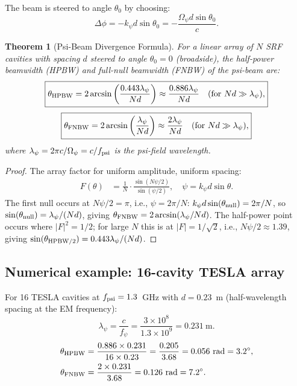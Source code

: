 \documentclass[11pt,twocolumn]{article}
\newcommand{\Opsi}{\Omega_\psi}
\newcommand{\ee}[1]{\times 10^{#1}}
\newtheorem{theorem}{Theorem}[section]
\begin{document}
The beam is steered to angle $\theta_0$ by choosing:
\begin{equation}
\boxed{
\Delta\phi = -k_\psi d\sin\theta_0 = -\frac{\Opsi d\sin\theta_0}{c}.
}
\label{eq:phase_steering}
\end{equation}

\begin{theorem}[Psi-Beam Divergence Formula]
\label{thm:beam_divergence}
For a linear array of $N$ SRF cavities with spacing $d$ steered to
angle $\theta_0 = 0$ (broadside), the half-power beamwidth (HPBW)
and full-null beamwidth (FNBW) of the psi-beam are:
\begin{equation}
\boxed{
\theta_{\rm HPBW} = 2\arcsin\left(\frac{0.443\lambda_\psi}{Nd}\right)
\approx \frac{0.886\lambda_\psi}{Nd}
\quad\text{(for }Nd\gg\lambda_\psi\text{)},
}
\label{eq:HPBW}
\end{equation}
\begin{equation}
\boxed{
\theta_{\rm FNBW} = 2\arcsin\left(\frac{\lambda_\psi}{Nd}\right)
\approx \frac{2\lambda_\psi}{Nd}
\quad\text{(for }Nd\gg\lambda_\psi\text{)},
}
\label{eq:FNBW}
\end{equation}
where $\lambda_\psi = 2\pi c/\Opsi = c/f_{\rm psi}$ is the psi-field
wavelength.
\end{theorem}

\begin{proof}
The array factor for uniform amplitude, uniform spacing:
\begin{align}
F(\theta) &= \frac{1}{N}\cdot\frac{\sin(N\psi/2)}{\sin(\psi/2)},
\quad \psi = k_\psi d\sin\theta.
\end{align}
The first null occurs at $N\psi/2 = \pi$, i.e., $\psi = 2\pi/N$:
$k_\psi d\sin(\theta_{\rm null}) = 2\pi/N$, so
$\sin(\theta_{\rm null}) = \lambda_\psi/(Nd)$, giving
$\theta_{\rm FNBW} = 2\arcsin(\lambda_\psi/Nd)$.
The half-power point occurs where $|F|^2 = 1/2$; for large $N$ this is
at $|F| = 1/\sqrt{2}$, i.e., $N\psi/2 \approx 1.39$, giving
$\sin(\theta_{\rm HPBW/2}) = 0.443\lambda_\psi/(Nd)$.
\end{proof}

\subsection{Numerical example: 16-cavity TESLA array}

For 16 TESLA cavities at $f_{\rm psi} = 1.3$~GHz with $d = 0.23$~m
(half-wavelength spacing at the EM frequency):
\begin{equation}
\lambda_\psi = \frac{c}{f_\psi} = \frac{3\ee{8}}{1.3\ee{9}} = 0.231~\text{m}.
\label{eq:lambda_psi_tesla}
\end{equation}
\begin{align}
\theta_{\rm HPBW} &= \frac{0.886\times0.231}{16\times0.23}
= \frac{0.205}{3.68} = 0.056~\text{rad} = 3.2^\circ,
\label{eq:HPBW_tesla}
\\
\theta_{\rm FNBW} &= \frac{2\times0.231}{3.68} = 0.126~\text{rad} = 7.2^\circ.
\label{eq:FNBW_tesla}
\end{align}
\end{document}

